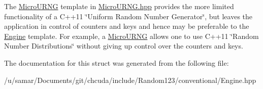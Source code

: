 The \hyperlink{classr123_1_1MicroURNG}{Micro\+U\+R\+NG} template in \hyperlink{MicroURNG_8hpp_source}{Micro\+U\+R\+N\+G.\+hpp} provides the more limited functionality of a C++11 \char`\"{}\+Uniform
\+Random Number Generator\char`\"{}, but leaves the application in control of counters and keys and hence may be preferable to the \hyperlink{structr123_1_1Engine}{Engine} template. For example, a \hyperlink{classr123_1_1MicroURNG}{Micro\+U\+R\+NG} allows one to use C++11 \char`\"{}\+Random Number
\+Distributions\char`\"{} without giving up control over the counters and keys. 

The documentation for this struct was generated from the following file\+:\begin{DoxyCompactItemize}
\item 
/u/samar/\+Documents/git/chcuda/include/\+Random123/conventional/Engine.\+hpp\end{DoxyCompactItemize}
